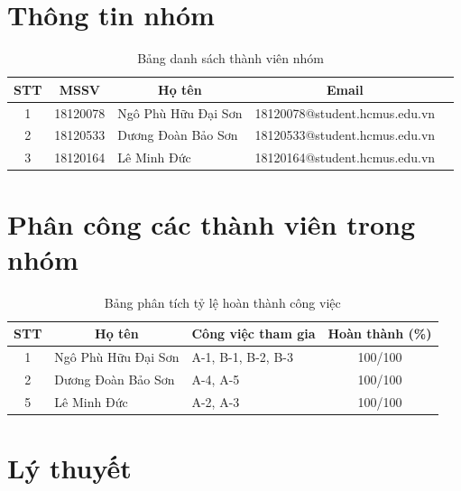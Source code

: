 \documentclass[a4paper, 12pt]{article}
\begin{document}
\section{Thông tin nhóm}
    \begin{table}[H]
        \centering
        \begin{tabular}{|c|c|l|c|c|}
        \hline
        STT & MSSV     & \multicolumn{1}{c|}{Họ tên} & Email\\ \hline
        1   & 18120078 & Ngô Phù Hữu Đại Sơn         & 18120078@student.hcmus.edu.vn\\ \hline
        2   & 18120533 & Dương Đoàn Bảo Sơn          & 18120533@student.hcmus.edu.vn\\ \hline
        3   & 18120164 & Lê Minh Đức                 & 18120164@student.hcmus.edu.vn\\ \hline
        \end{tabular}
        \caption{Bảng danh sách thành viên nhóm}
    \end{table}

\section{Phân công các thành viên trong nhóm}

    \begin{table}[H]
        \centering
        \begin{tabular}{|c|l|l|c|}
        \hline
        STT & \multicolumn{1}{c|}{Họ tên} & \multicolumn{1}{c|}{Công việc tham gia}  & Hoàn thành (\%) \\ \hline
        1   & Ngô Phù Hữu Đại Sơn         & A-1, B-1, B-2, B-3             & 100/100 \\ \hline
        2   & Dương Đoàn Bảo Sơn          & A-4, A-5                       & 100/100 \\ \hline
        5   & Lê Minh Đức                 & A-2, A-3                       & 100/100 \\ \hline
        \end{tabular}
        \caption{Bảng phân tích tỷ lệ hoàn thành công việc}
    \end{table}
\clearpage

\section{Lý thuyết}





\end{document}
